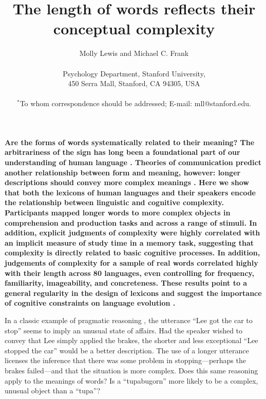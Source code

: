 \documentclass[12pt]{article}
\title{The length of words reflects their conceptual complexity}
\author
{Molly Lewis and Michael C. Frank\\
\\
\normalsize{Psychology Department, Stanford University,}\\
\normalsize{450 Serra Mall, Stanford, CA 94305, USA}\\
\\
\normalsize{$^\ast$To whom correspondence should be addressed; E-mail: mll@stanford.edu.}
}
\date{}
\newenvironment{sciabstract}{%
\begin{quote} \bf}
{\end{quote}}
\begin{document}
 

\baselineskip24pt

\maketitle 


					


{\bf Are the forms of words systematically related to their meaning? The arbitrariness of the sign has long been a foundational part of our understanding of human language \cite{saussure,hockett1960}. Theories of communication predict another relationship between form and meaning, however: longer descriptions should convey more complex meanings \cite{horn1984,jaeger2006}. Here we show that both the lexicons of human languages and their speakers encode the relationship between linguistic and cognitive complexity. Participants mapped longer words to more complex objects in comprehension and production tasks and across a range of stimuli. In addition, explicit judgments of complexity were highly correlated with an implicit measure of study time in a memory task, suggesting that complexity is directly related to basic cognitive processes. In addition, judgements of complexity for a sample of real words correlated highly with their length across 80 languages, even controlling for frequency, familiarity, imageability, and concreteness. These results point to a general regularity in the design of lexicons and suggest the importance of cognitive constraints on language evolution \cite{christiansen2008,lieberman2007}.}


In a classic example of pragmatic reasoning \cite{horn1984}, the utterance ``Lee got the car to stop'' seems to imply an unusual state of affairs. Had the speaker wished to convey that Lee simply applied the brakes, the shorter and less exceptional ``Lee stopped the car'' would be a better description. The use of a longer utterance licenses the inference that there was some problem in stopping---perhaps the brakes failed---and that the situation is more complex. Does this same reasoning apply to the meanings of words? Is a ``tupabugorn'' more likely to be a complex, unusual object than a ``tupa''? 
\end{document}
